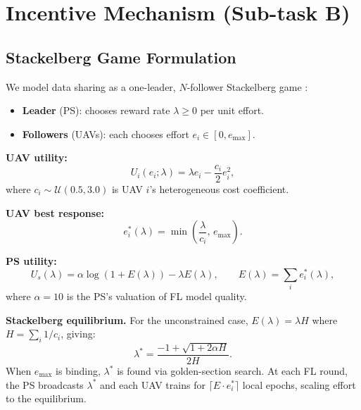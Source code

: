 \documentclass[12pt,a4paper]{article}
\begin{document}
\section{Incentive Mechanism (Sub-task B)}
\label{sec:incentive}

\subsection{Stackelberg Game Formulation}

We model data sharing as a one-leader, $N$-follower Stackelberg game
\cite{zhan2020}:

\begin{itemize}
  \item \textbf{Leader} (PS): chooses reward rate $\lambda \geq 0$ per unit effort.
  \item \textbf{Followers} (UAVs): each chooses effort $e_i \in [0, e_{\max}]$.
\end{itemize}

\noindent\textbf{UAV utility:}
\begin{equation}
  U_i(e_i;\lambda) = \lambda e_i - \frac{c_i}{2} e_i^2,
  \label{eq:uav_utility}
\end{equation}
where $c_i \sim \mathcal{U}(0.5, 3.0)$ is UAV $i$'s heterogeneous cost coefficient.

\noindent\textbf{UAV best response:}
\begin{equation}
  e_i^*(\lambda) = \min\!\left(\frac{\lambda}{c_i},\, e_{\max}\right).
  \label{eq:br}
\end{equation}

\noindent\textbf{PS utility:}
\begin{equation}
  U_s(\lambda) = \alpha \log(1 + E(\lambda)) - \lambda E(\lambda),
  \qquad E(\lambda) = \textstyle\sum_i e_i^*(\lambda),
  \label{eq:ps_utility}
\end{equation}
where $\alpha = 10$ is the PS's valuation of FL model quality.

\noindent\textbf{Stackelberg equilibrium.}
For the unconstrained case, $E(\lambda) = \lambda H$ where $H = \sum_i 1/c_i$, giving:
\begin{equation}
  \lambda^* = \frac{-1 + \sqrt{1 + 2\alpha H}}{2H}.
  \label{eq:lambda_star}
\end{equation}
When $e_{\max}$ is binding, $\lambda^*$ is found via golden-section search.
At each FL round, the PS broadcasts $\lambda^*$ and each UAV trains for
$\lceil E \cdot e_i^* \rceil$ local epochs, scaling effort to the equilibrium.
\end{document}
